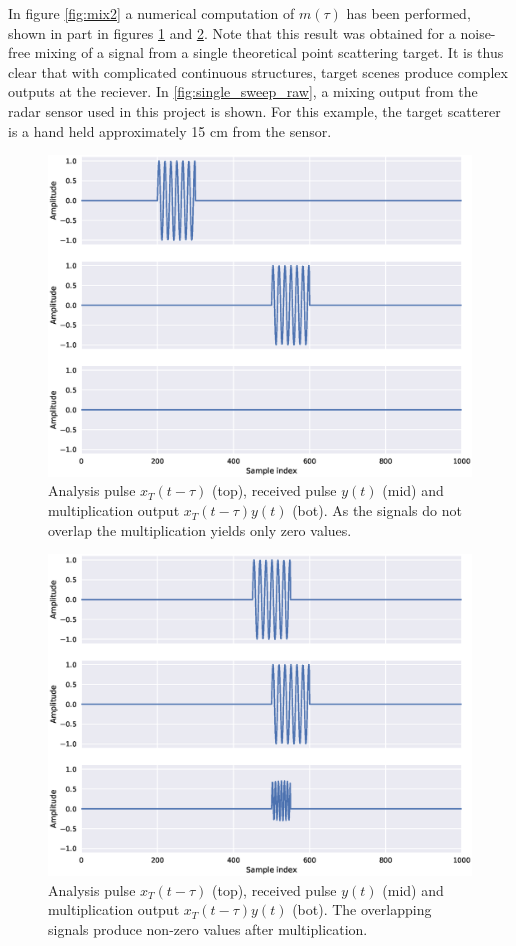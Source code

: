 In figure \ref{fig:mix2} a numerical computation of $m(\tau)$ has been performed, shown in part in figures \ref{fig:mix0} and \ref{fig:mix1}. Note that this result was obtained for a noise-free mixing of a signal from a single theoretical point scattering target. It is thus clear that with complicated continuous structures, target scenes produce complex outputs at the reciever. In \ref{fig:single_sweep_raw}, a mixing output from the radar sensor used in this project is shown. For this example, the target scatterer is a hand held approximately 15 cm from the sensor. 

\begin{figure}[t]
	\centering
	\includegraphics[scale=0.5]{figs_temp/mixing0}
	\caption{Analysis pulse $x_T(t-\tau)$ (top), received pulse $y(t)$ (mid) and multiplication output $x_T(t-\tau)y(t)$ (bot). As the signals do not overlap the multiplication yields only zero values.}
	\label{fig:mix0}
\end{figure}

\begin{figure}[t]
	\centering
	\includegraphics[scale=0.5]{figs_temp/mixing1}
	\caption{Analysis pulse $x_T(t-\tau)$ (top), received pulse $y(t)$ (mid) and multiplication output $x_T(t-\tau)y(t)$ (bot). The overlapping signals produce non-zero values after multiplication.}
	\label{fig:mix1}
\end{figure}

